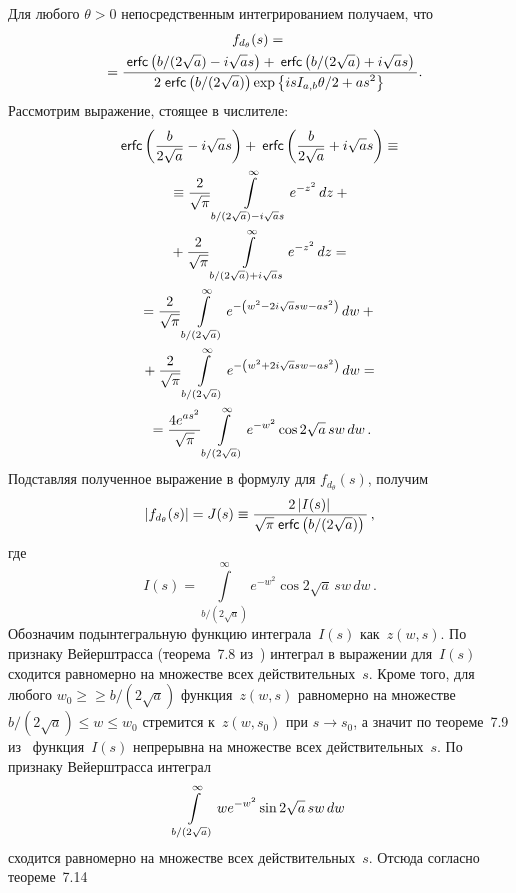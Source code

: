 \begin{multicols}{2}
Для любого $\theta>0$ непосредственным интегрированием получаем, что
\begin{multline*}
f_{d_{\theta}}(s) ={}\\
= \displaystyle\frac{\displaystyle \:{\sf erfc}\left({b}/(2\sqrt{a})- i\sqrt{a}s\right) + 
\:{\sf erfc}\left({b}/({2\sqrt{a}}) + i\sqrt{a}s\right)\mathstrut}{\displaystyle 2\;{\sf erfc}\left (b/(2\sqrt{a})\right) \exp\left\{{isI_{a,b} \theta}/2 + as^2\right\}\mathstrut}.\hspace*{-7.37994pt}
\end{multline*}
Рассмотрим выражение, стоящее в числителе:
\begin{multline*}
\:{\sf erfc}\left(\displaystyle\frac{\displaystyle b\mathstrut}{\displaystyle 2\sqrt{a}\mathstrut} - i\sqrt{a}s\right) + \:{\sf erfc}\left(\displaystyle\frac{\displaystyle b\mathstrut}{\displaystyle 2\sqrt{a}\mathstrut} + i\sqrt{a}s\right) \equiv{}\\
{}
\equiv \displaystyle\frac{\displaystyle 2\mathstrut}{\displaystyle \sqrt{\pi}\mathstrut}\int\limits_{{b}/(2\sqrt{a}) - i\sqrt{a}s}^{\infty} e^{-z^2}\,dz +{}\\
{}+
 \displaystyle\frac{\displaystyle 2\mathstrut}{\displaystyle \sqrt{\pi}\mathstrut}\int\limits_{{b}/(2\sqrt{a}) + i\sqrt{a}s}^{\infty} e^{-z^2}\,dz ={}\\
= \displaystyle\frac{\displaystyle 2\mathstrut}{\displaystyle \sqrt{\pi}\mathstrut}\int\limits_{{b}/(2\sqrt{a})}^{\infty}e^{-\left(w^2 - 2i\sqrt{a}sw - as^2\right)}\,dw+{}\\
{}+
 \displaystyle\frac{\displaystyle 2\mathstrut}{\displaystyle \sqrt{\pi}\mathstrut}\int\limits_{{b}/(2\sqrt{a})}^{\infty}e^{-\left(w^2 + 2i\sqrt{a}sw - as^2\right)}\,dw ={}\\
{}
= \displaystyle\frac{\displaystyle 4e^{as^2}\mathstrut}{\displaystyle \sqrt{\pi}\mathstrut} \int\limits_{{b}/(2\sqrt{a})}^{\infty}e^{-w^2} \cos 2\sqrt{a}\,sw\, dw\,.
\end{multline*}
Подставляя полученное выражение в формулу для $f_{d_{\theta}}(s)$, получим
\begin{equation}
\label{l22}
\left|f_{d_{\theta}}(s)\right| = J(s) \equiv \displaystyle\frac{\displaystyle 2\left|I(s)\right|\mathstrut}{\displaystyle \sqrt{\pi}\;{\sf erfc}\left(
b/(2\sqrt{a})\right)\mathstrut}\,,
\end{equation}
где
$$
I(s) = \int\limits_{{b}/(2\sqrt{a})}^{\infty} e^{-w^2} \cos 2\sqrt{a}\,s w\, dw\,.
$$
Обозначим подынтегральную функцию интеграла~$I(s)$ как~$z(w,s)$. По признаку Вейерштрасса (теорема~7.8 
из~\cite{matan}) интеграл в выражении для~$I(s)$\linebreak
сходится равномерно на множестве всех действительных~$s$. 
Кроме того, для любого $w_0 \geq$\linebreak $\geq {b}/(2\sqrt{a})$ функция~$z(w,s)$ равномерно на множестве ${b}/(2\sqrt{a}) \leq 
w \leq w_0$ стремится к~$z(w,s_0)$ при $s\to s_0$, а значит по теореме~7.9 из~\cite{matan} функция~$I(s)$ 
непрерывна на множестве всех действительных~$s$. По признаку Вейерштрасса интеграл
$$
\int\limits_{{b}/(2\sqrt{a})}^{\infty} we^{-w^2} \sin 2\sqrt{a}\,sw\,dw
$$
сходится равномерно на множестве всех действительных~$s$. Отсюда согласно теореме~7.14 

\end{multicols}

